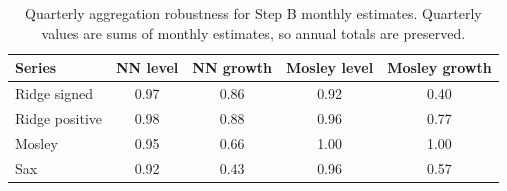 \begin{table}[!htb]
\centering
\caption{Quarterly aggregation robustness for Step B monthly estimates. Quarterly values are sums of monthly estimates, so annual totals are preserved.}
\label{tab:quarterly_stepb_robustness}
\begin{tabular}{l c c c c}
\toprule
Series & NN level & NN growth & Mosley level & Mosley growth \\
\midrule
Ridge signed & 0.97 & 0.86 & 0.92 & 0.40 \\
Ridge positive & 0.98 & 0.88 & 0.96 & 0.77 \\
Mosley & 0.95 & 0.66 & 1.00 & 1.00 \\
Sax & 0.92 & 0.43 & 0.96 & 0.57 \\
\bottomrule
\end{tabular}
\end{table}
